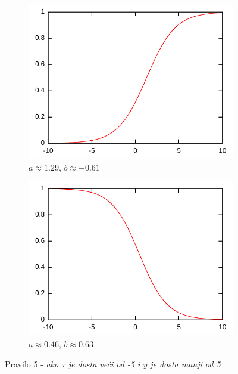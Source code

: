 \documentclass{article}
\begin{document}
\begin{figure}[h]
    \centering
    \begin{subfigure}[b]{0.49\textwidth}
        \centering
        \includegraphics[width=\textwidth]{img/rule-5-A.pdf}
        \caption{$ a \approx 1.29 $, $ b \approx -0.61 $}
    \end{subfigure}
    \hfill
    \begin{subfigure}[b]{0.49\textwidth}
        \centering
        \includegraphics[width=\textwidth]{img/rule-5-B.pdf}
        \caption{$ a \approx 0.46 $, $ b \approx 0.63 $}
    \end{subfigure}
    \hfill
    \caption{Pravilo 5 - \textit{ako x je dosta veći od -5 i y je dosta manji od 5}}
    \label{rule-5}
\end{figure}
\end{document}
